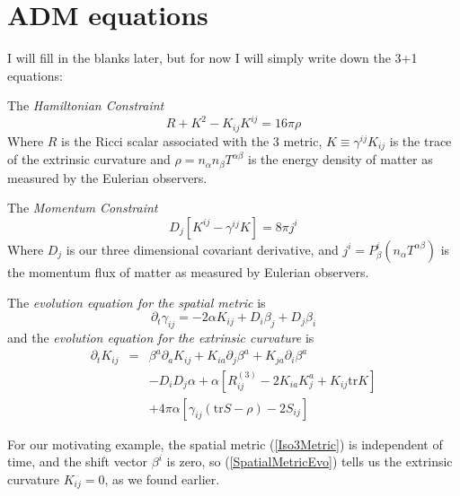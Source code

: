 \documentclass{article}
\def\pd{{\partial}}
\begin{document}
\section{ADM equations}
I will fill in the blanks later, but for now I will simply write down the 3+1 equations:

The \emph{Hamiltonian Constraint}
\begin{equation}
R+K^2-K_{ij}K^{ij}=16\pi \rho
\end{equation}\label{Hamiltonian}
Where $R$ is the Ricci scalar associated with the 3 metric, $K\equiv \gamma^{ij}K_{ij}$ is the trace of the extrinsic curvature and $\rho=n_\alpha n_\beta T^{\alpha \beta}$ is the energy density of matter as measured by the Eulerian observers.

The \emph{Momentum Constraint}
\begin{equation}
D_j \left[ K^{ij}-\gamma^{ij}K \right]=8\pi j^i
\end{equation}\label{Momentum}
Where $D_j$ is our three dimensional covariant derivative, and $j^i=P^i_\beta \left(n_\alpha T^{\alpha \beta}\right)$ is the momentum flux of matter as measured by Eulerian observers.

The \emph{evolution equation for the spatial metric} is
\begin{equation}\label{SpatialMetricEvo}
\pd_t \gamma_{ij}=-2\alpha K_{ij} + D_i\beta_j + D_j \beta_i
\end{equation}
and the \emph{evolution equation for the extrinsic curvature} is
\begin{equation}\begin{array}{ccl}
\partial_t K_{ij} &=& \beta^a \partial_a K_{ij} + K_{ia} \partial_j \beta^a + K_{ja}\partial_i \beta^a \\
 & & - D_i D_j \alpha + \alpha[R^{(3)}_{ij}-2K_{ia}K^a_j + K_{ij} \mbox{tr} K] \\
 & & +4\pi\alpha[\gamma_{ij}(\mbox{tr} S-\rho)-2S_{ij}] 
\end{array} \end{equation}\label{ExtrinsicCurvatureEvo}

For our motivating example, the spatial metric (\ref{Iso3Metric}) is independent of time, and the shift vector $\beta^i$ is zero, so (\ref{SpatialMetricEvo}) tells us the extrinsic curvature $K_{ij}=0$, as we found earlier. 





 
\end{document}
